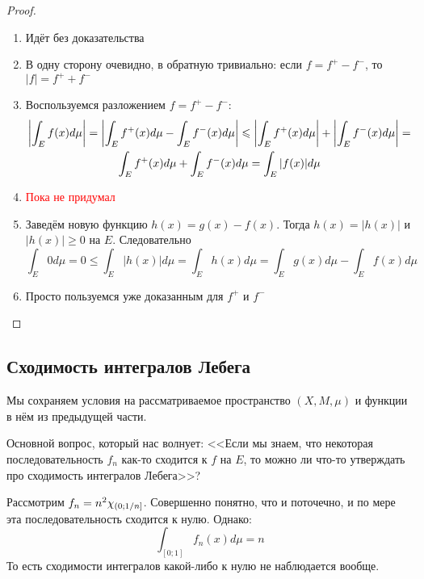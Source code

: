 \begin{proof}~
	\begin{enumerate}
		\item Идёт без доказательства
		
		\item В одну сторону очевидно, в обратную тривиально: если $f = f^+ - f^-$, то $|f| = f^+ + f^-$
		
		\item Воспользуемся разложением $f = f^+ - f^-$:
		\begin{multline*}
			\left|\int_E f(x)d\mu\right| = \left|\int_E f^+(x)d\mu - \int_E f^-(x)d\mu\right| \leqslant \left|\int_E f^+(x)d\mu\right| + \left|\int_E f^-(x)d\mu\right| =
			\\
			\int_E f^+(x)d\mu + \int_E f^-(x)d\mu = \int_E |f(x)|d\mu
		\end{multline*}
		
		\item \textcolor{red}{Пока не придумал}
		
		\item Заведём новую функцию $h(x) = g(x) - f(x)$. Тогда $h(x) = |h(x)|$ и $|h(x)| \ge 0$ на $E$. Следовательно
		\[
			\int_E 0d\mu = 0 \le \int_E |h(x)|d\mu = \int_E h(x)d\mu = \int_E g(x)d\mu - \int_E f(x)d\mu
		\]
		
		\item Просто пользуемся уже доказанным для $f^+$ и $f^-$
	\end{enumerate}
\end{proof}

\subsection{Сходимость интегралов Лебега}

\begin{note}
	Мы сохраняем условия на рассматриваемое пространство $(X, M, \mu)$ и функции в нём из предыдущей части.
\end{note}

\begin{note}
	Основной вопрос, который нас волнует: <<Если мы знаем, что некоторая последовательность $f_n$ как-то сходится к $f$ на $E$, то можно ли что-то утверждать про сходимость интегралов Лебега>>?
\end{note}

\begin{example}
	Рассмотрим $f_n = n^2 \chi_{\left(0; 1 / n\right]}$. Совершенно понятно, что и поточечно, и по мере эта последовательность сходится к нулю. Однако:
	\[
		\int_{[0; 1]} f_n(x)d\mu = n
	\]
	То есть сходимости интегралов какой-либо к нулю не наблюдается вообще.
\end{example}

